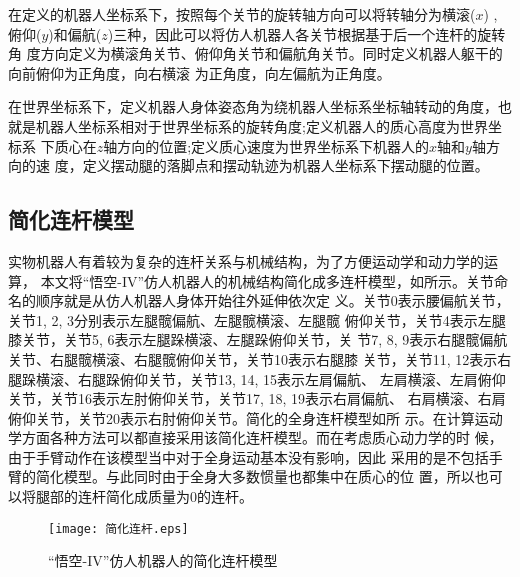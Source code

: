 在定义的机器人坐标系下，按照每个关节的旋转轴方向可以将转轴分为横滚($x$) ,
俯仰($y$)和偏航($z$)三种，因此可以将仿人机器人各关节根据基于后一个连杆的旋转角
度方向定义为横滚角关节、俯仰角关节和偏航角关节。同时定义机器人躯干的向前俯仰为正角度，向右横滚
为正角度，向左偏航为正角度。

在世界坐标系下，定义机器人身体姿态角为绕机器人坐标系坐标轴转动的角度，也
就是机器人坐标系相对于世界坐标系的旋转角度;定义机器人的质心高度为世界坐标系
下质心在$z$轴方向的位置;定义质心速度为世界坐标系下机器人的$x$轴和$y$轴方向的速
度，定义摆动腿的落脚点和摆动轨迹为机器人坐标系下摆动腿的位置。
\subsection{简化连杆模型}
实物机器人有着较为复杂的连杆关系与机械结构，为了方便运动学和动力学的运算，
本文将“悟空-IV”仿人机器人的机械结构简化成多连杆模型，如所示。关节命名的顺序就是从仿人机器人身体开始往外延伸依次定
义。关节0表示腰偏航关节，关节1, 2, 3分别表示左腿髋偏航、左腿髋横滚、左腿髋
俯仰关节，关节4表示左腿膝关节，关节5, 6表示左腿跺横滚、左腿跺俯仰关节，关
节7,  8,   9表示右腿髋偏航关节、右腿髋横滚、右腿髋俯仰关节，关节10表示右腿膝
关节，关节11, 12表示右腿跺横滚、右腿跺俯仰关节，关节13, 14, 15表示左肩偏航、
左肩横滚、左肩俯仰关节，关节16表示左肘俯仰关节，关节17, 18, 19表示右肩偏航、
右肩横滚、右肩俯仰关节，关节20表示右肘俯仰关节。简化的全身连杆模型如所
示。在计算运动学方面各种方法可以都直接采用该简化连杆模型。而在考虑质心动力学的时
候，由于手臂动作在该模型当中对于全身运动基本没有影响，因此
采用的是不包括手臂的简化模型。与此同时由于全身大多数惯量也都集中在质心的位
置，所以也可以将腿部的连杆简化成质量为0的连杆。
\begin{figure}[htbp]
    \centering
    \texttt{[image: 简化连杆.eps]}
    \caption{\label{fig:link_model}“悟空-IV”仿人机器人的简化连杆模型}
\end{figure}
